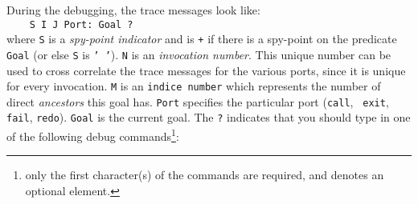 During the debugging, the trace messages look like:\\

{\tt~~~ S I J Port: Goal ?}\\

where {\tt S} is a {\em spy-point indicator} and is {\tt +} if there is a
spy-point on the predicate {\tt Goal} (or else {\tt S} is {\tt '~'}).
{\tt N} is an {\em invocation number}. This unique number can
be used to cross correlate the trace messages for the various ports,
since it is unique for every invocation. {\tt M} is an {\tt indice
number} which represents the number of direct {\em ancestors} this
goal has. {\tt Port} specifies the particular port ({\tt call}, {\tt
exit}, {\tt fail}, {\tt	redo}). {\tt Goal} is the current goal. The
{\tt ?} indicates that you should type in one of the following debug
commands\footnote{only the first character(s) of the commands are
required, and {\tt < x >} denotes an optional element.}: \\

